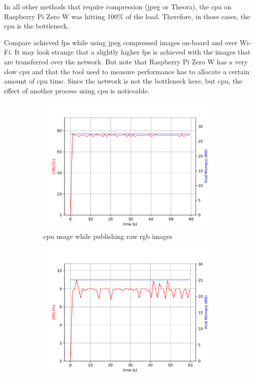 In all other methods that require compression (\ac{jpeg} or Theora), the \ac{cpu} on Raspberry Pi Zero W was hitting 100\% of the load.
Therefore, in those cases, the \ac{cpu} is the bottleneck.

Compare achieved \ac{fps} while using \ac{jpeg} compressed images on-board and over Wi-Fi. 
It may look strange that a slightly higher \ac{fps} is achieved with the images that are transferred over the network. 
But note that Raspberry Pi Zero W has a very slow \ac{cpu} and that the tool used to measure performance has to allocate a certain amount of \ac{cpu} time.
Since the network is not the bottleneck here, but \ac{cpu}, the effect of another process using \ac{cpu} is noticeable.

\begin{figure}[H]
\centering
\begin{subfigure}{.8\textwidth}
  \centering
  \includegraphics[width=\linewidth]{results/figures/camera_raw_cpu}
  \caption{\ac{cpu} usage while publishing raw \ac{rgb} images}
  \label{fig:results:camera_load:raw_cpu}
\end{subfigure}
\begin{subfigure}{.8\textwidth}
  \centering
  \includegraphics[width=\linewidth]{results/figures/camera_jpeg_gpu.pdf}

\end{subfigure}
\end{figure}

